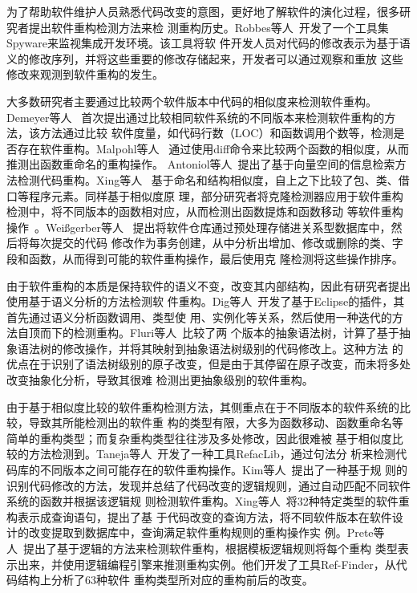为了帮助软件维护人员熟悉代码改变的意图，更好地了解软件的演化过程，很多研究者提出软件重构检测方法来检
测重构历史。Robbes等人~\cite{robbes2008spyware}开发了一个工具集Spyware来监视集成开发环境。该工具将软
件开发人员对代码的修改表示为基于语义的修改序列，并将这些重要的修改存储起来，开发者可以通过观察和重放
这些修改来观测到软件重构的发生。

大多数研究者主要通过比较两个软件版本中代码的相似度来检测软件重构。Demeyer等人
~\cite{demeyer2000finding}首次提出通过比较相同软件系统的不同版本来检测软件重构的方法，该方法通过比较
软件度量，如代码行数（LOC）和函数调用个数等，检测是否存在软件重构。Malpohl等人
~\cite{malpohl2003renaming}通过使用diff命令来比较两个函数的相似度，从而推测出函数重命名的重构操作。
Antoniol等人~\cite{antoniol2004automatic}提出了基于向量空间的信息检索方法检测代码重构。Xing等人
~\cite{xing2005umldiff}基于命名和结构相似度，自上之下比较了包、类、借口等程序元素。同样基于相似度原
理，部分研究者将克隆检测器应用于软件重构检测中，将不同版本的函数相对应，从而检测出函数提炼和函数移动
等软件重构操作~\cite{van2003reconstruction,kim2005functions}。Weißgerber等人
~\cite{weissgerber2006identifying}提出将软件仓库通过预处理存储进关系型数据库中，然后将每次提交的代码
修改作为事务创建，从中分析出增加、修改或删除的类、字段和函数，从而得到可能的软件重构操作，最后使用克
隆检测将这些操作排序。

由于软件重构的本质是保持软件的语义不变，改变其内部结构，因此有研究者提出使用基于语义分析的方法检测软
件重构。Dig等人~\cite{dig2006automated}开发了基于Eclipse的插件，其首先通过语义分析函数调用、类型使
用、实例化等关系，然后使用一种迭代的方法自顶而下的检测重构。Fluri等人~\cite{fluri2007change}比较了两
个版本的抽象语法树，计算了基于抽象语法树的修改操作，并将其映射到抽象语法树级别的代码修改上。这种方法
的优点在于识别了语法树级别的原子改变，但是由于其停留在原子改变，而未将多处改变抽象化分析，导致其很难
检测出更抽象级别的软件重构。

由于基于相似度比较的软件重构检测方法，其侧重点在于不同版本的软件系统的比较，导致其所能检测出的软件重
构的类型有限，大多为函数移动、函数重命名等简单的重构类型；而复杂重构类型往往涉及多处修改，因此很难被
基于相似度比较的方法检测到。Taneja等人~\cite{taneja2007automated}开发了一种工具RefacLib，通过句法分
析来检测代码库的不同版本之间可能存在的软件重构操作。Kim等人~\cite{kim2007automatic}提出了一种基于规
则的识别代码修改的方法，发现并总结了代码改变的逻辑规则，通过自动匹配不同软件系统的函数并根据该逻辑规
则检测软件重构。Xing等人~\cite{xing2006refactoring}将32种特定类型的软件重构表示成查询语句，提出了基
于代码改变的查询方法，将不同软件版本在软件设计的改变提取到数据库中，查询满足软件重构规则的重构操作实
例。Prete等人~\cite{prete2010template}提出了基于逻辑的方法来检测软件重构，根据模板逻辑规则将每个重构
类型表示出来，并使用逻辑编程引擎来推测重构实例。他们开发了工具Ref-Finder，从代码结构上分析了63种软件
重构类型所对应的重构前后的改变。


